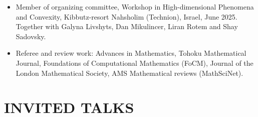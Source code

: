 \documentclass[margin, 10pt]{res}
\begin{document}
\begin{resume}
\begin{itemize}
    \item Member of organizing committee, Workshop in High-dimensional Phenomena and Convexity,  Kibbutz-resort Nahsholim (Technion), Israel, June 2025.  Together with Galyna Livshyts, Dan Mikulincer, Liran Rotem and Shay Sadovsky.
    \item Referee and review work: Advances in Mathematics, Tohoku Mathematical Journal, Foundations of Computational Mathematics (FoCM), Journal of the London Mathematical Society, AMS Mathematical reviews (MathSciNet).
\end{itemize}

\section{INVITED TALKS}


\end{resume}
\end{document}
